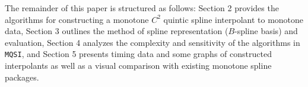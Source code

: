 The remainder of this paper is structured as follows: Section 2
provides the algorithms for constructing a monotone $C^2$ quintic
spline interpolant to monotone data, Section 3 outlines the method of
spline representation ($B$-spline basis) and evaluation, Section 4
analyzes the complexity and sensitivity of the algorithms in {\tt
  MQSI}, and Section 5 presents timing data and some graphs of
constructed interpolants as well as a visual comparison with existing
monotone spline packages.

